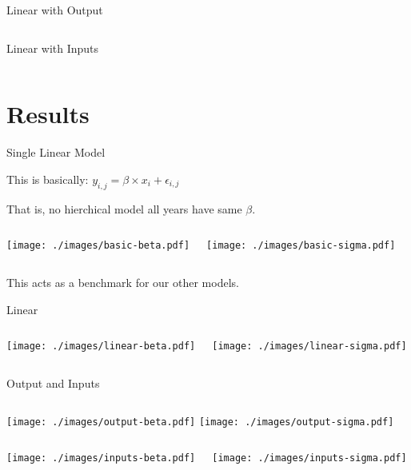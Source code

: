 \documentclass{beamer}
\begin{document}
\begin{frame}[containsverbatim]{Linear with Output}

  \inputminted{jags}{jags/output.jags}
\end{frame}


\begin{frame}[containsverbatim]{Linear with Inputs}
  \inputminted{jags}{jags/inputs.jags}
\end{frame}

\section{Results}

\begin{frame}{Single Linear Model}

  This is basically: $y_{i,j} = \beta \times x_{i} + \epsilon_{i,j}$

  That is, no hierchical model all years have same \(\beta\).
  \pause{}
  
  \begin{columns}
    \texttt{[image: ./images/basic-beta.pdf]}
    
    \texttt{[image: ./images/basic-sigma.pdf]}
  \end{columns}

  This acts as a benchmark for our other models.
\end{frame}

\begin{frame}{Linear}
  \begin{columns}
    \texttt{[image: ./images/linear-beta.pdf]}
    \pause
    
    \texttt{[image: ./images/linear-sigma.pdf]}
  \end{columns}
\end{frame}


\begin{frame}{Output and Inputs}
  \begin{columns}
     \texttt{[image: ./images/output-beta.pdf]}    
    \texttt{[image: ./images/output-sigma.pdf]}
  \end{columns}
  
    \pause
  \begin{columns}
    \texttt{[image: ./images/inputs-beta.pdf]}
    
    \texttt{[image: ./images/inputs-sigma.pdf]}
  \end{columns}
  
\end{frame}
\end{document}
